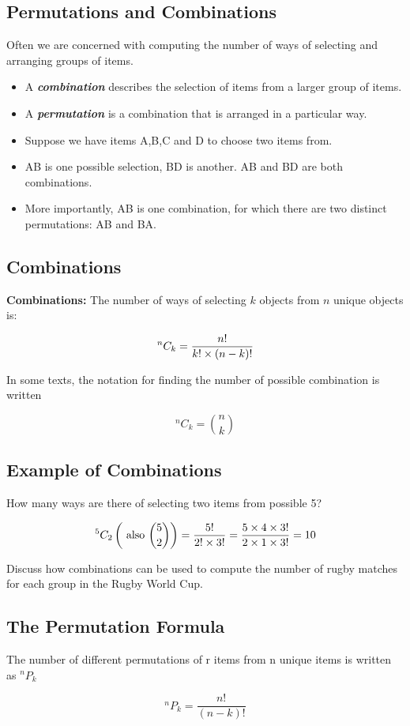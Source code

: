 \documentclass[]{report}
\begin{document}
	
	{
		\subsection{Permutations and Combinations}
		
		
		Often we are concerned with computing the number of ways of selecting and arranging groups of items. \begin{itemize} \item  A \textbf{\emph{combination}} describes the selection of items from a larger group of items.  \item A \textbf{\emph{permutation}} is a combination that is arranged in a particular way.
		\end{itemize}
		
		\bigskip
		\begin{itemize}
			\item Suppose we have items A,B,C and D to choose two items from.
			\item AB is one possible selection, BD is another. AB and BD are both combinations.
			\item More importantly, AB is one combination, for which there are two distinct permutations: AB and BA.
		\end{itemize}
	}
	
	{
		\subsection{Combinations}
		
		\textbf{Combinations: }
		The number of ways of selecting $k$ objects from $n$ unique objects is:
		
		\[ ^n C_k = {n!  \over k! \times (n-k)!} \]
		
		In some texts, the notation for finding the number of possible combination is written
		
		\[ ^n C_k =  {n \choose k} \]
		
	}
	
	{
		\subsection{Example of Combinations}
		How many ways are there of selecting two items from possible 5?
		
		\[ ^5 C_2   \left( \mbox{ also }  {5 \choose 2}  \right) =  {5!  \over 2! \times 3!} =  {5 \times 4 \times 3!  \over 2 \times 1 \times 3!} = 10  \]
		
		\bigskip
		Discuss how combinations can be used to compute the number of rugby matches for each group in the Rugby World Cup.
		
	}
	{
		\subsection{The Permutation Formula}
		The number of different permutations of r items from n unique items is written as $^n P_k$
		
		
		\[ ^n P_k = \frac{n!}{(n-k)!}\]
	}
	
\end{document}

